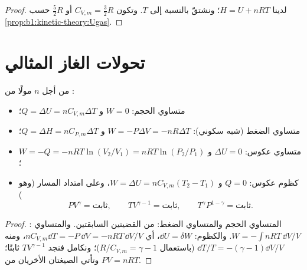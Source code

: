 \begin{proof}
لدينا $H = U + nRT$؛ ونشتقّ بالنسبة إلى $T$. وتكون $C_{V,m} = \tfrac32 R$ أو
$\tfrac52 R$ حسب \cref{prop:b1:kinetic-theory:Ugas}.
\end{proof}

\section{تحولات الغاز المثالي}

\begin{proposition}\label{prop:b1:first-law:transformations}
من أجل $n$ مولًا من :
\begin{itemize}
  \item متساوي الحجم: $W = 0$ و $Q = \Delta U = nC_{V,m}\Delta T$؛
  \item متساوي الضغط (شبه سكوني): $W = -P\Delta V = -nR\Delta T$ و $Q = \Delta H =
        nC_{P,m}\Delta T$؛
  \item متساوي  عكوس: $\Delta U = 0$ و $W = -Q = -nRT\ln(V_2/V_1) =
        nRT\ln(P_2/P_1)$؛
  \item كظوم عكوس: $Q = 0$ و $W = \Delta U = nC_{V,m}(T_2 - T_1)$،
        وعلى امتداد المسار (وهو \emph{})
        \[
        PV^\gamma = \text{ثابت}, \qquad TV^{\gamma - 1} = \text{ثابت}, \qquad
        T^\gamma P^{1 - \gamma} = \text{ثابت} .
        \]
\end{itemize}
\end{proposition}

\begin{proof}
المتساوي الحجم والمتساوي الضغط: من القضيتين السابقتين. والمتساوي : $W =
-\int nRT\,\dd V/V$. والكظوم: $\dd U = \delta W$، أي $nC_{V,m}\dd T =
-P\,\dd V = -nRT\,\dd V/V$، ومنه $\dd T/T = -(\gamma - 1)\dd V/V$ (باستعمال
$R/C_{V,m} = \gamma - 1$)؛ ونكامل فنجد $TV^{\gamma - 1}$ ثابتًا؛ وتأتي الصيغتان
الأخريان من $PV = nRT$.
\end{proof}

